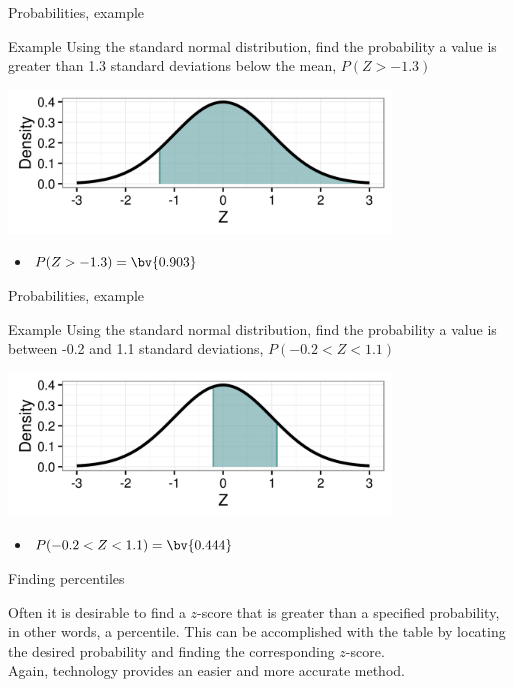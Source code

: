 \documentclass[xcolor=table, handout]{beamer}
\begin{document}
\begin{frame}{Probabilities, example}
\begin{exampleblock}{Example}
Using the standard normal distribution, find the probability a value is greater than 1.3 standard deviations below the mean, $P(Z > -1.3)$\\
\smallskip
{\centering
\includegraphics[width=4in]{../images/ch6_ex02}
\par}
\begin{itemize}
\pause\item $P(Z > -1.3) = \bv{0.903}$
\end{itemize}
\end{exampleblock}
\end{frame}

\begin{frame}{Probabilities, example}
\begin{exampleblock}{Example}
Using the standard normal distribution, find the probability a value is between -0.2 and 1.1 standard deviations, $P(-0.2 < Z < 1.1)$\\
\smallskip
{\centering
\includegraphics[width=4in]{../images/ch6_ex03}
\par}
\begin{itemize}
\pause\item $P(-0.2 < Z < 1.1) = \bv{0.444}$
\end{itemize}
\end{exampleblock}
\end{frame}

\begin{frame}{Finding percentiles}
\begin{block}{}
Often it is desirable to find a $z$-score that is greater than a specified probability, in other words, a percentile. This can be accomplished with the table by locating the desired probability and finding the corresponding $z$-score.\\
\medskip
Again, technology provides an easier and more accurate method.
\end{block}
\end{frame}
\end{document}

